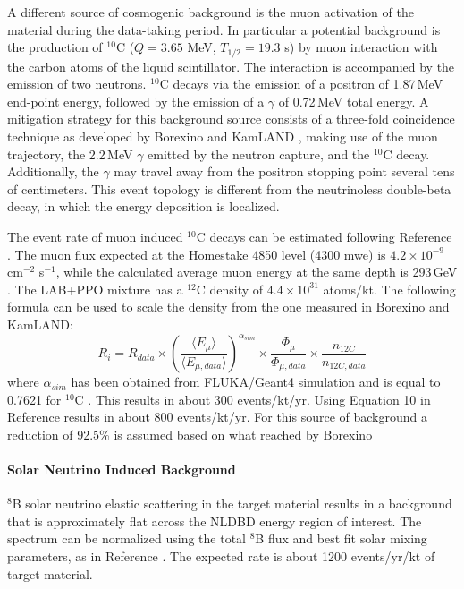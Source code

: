 A different source of cosmogenic background is the muon activation of the
material during the data-taking period. In particular a potential background
is the production of $^{10}$C ($Q=3.65$ MeV, $T_{1/2}=19.3$ s) by muon
interaction with the carbon atoms of the liquid scintillator. The interaction
is accompanied by the emission of two neutrons. $^{10}$C decays via the
emission of a positron of 1.87\,MeV end-point energy, followed by the
emission of a $\gamma$ of 0.72\,MeV total energy. A mitigation strategy for
this background source consists of a three-fold coincidence technique as
developed by Borexino and KamLAND \cite{galb05, gando16}, making use of the
muon trajectory, the 2.2\,MeV $\gamma$ emitted by the neutron capture, and
the $^{10}$C decay. Additionally, the $\gamma$ may travel away from the
positron stopping point several tens of centimeters. This event topology is
different from the neutrinoless double-beta decay, in which the energy
deposition is localized.

The event rate of muon induced $^{10}$C decays can be estimated following
Reference \cite{hagn00}. The muon flux expected at the Homestake 4850 level
(4300 mwe) is $4.2\times10^{-9}$ cm$^{-2}$ s$^{-1}$, while the calculated
average muon energy at the same depth is 293\,GeV \cite{mei06}. The
LAB+PPO mixture has a $^{12}$C density of $4.4\times 10^{31}$ atoms/kt.
The following formula can be used to scale the density from the one measured
in Borexino and KamLAND:
\begin{equation}
R_{i} = R_{data} \times 
{\left( \frac{\langle E_{\mu} \rangle}
             {\langle E_{\mu, data} \rangle} \right) }^{\alpha_{sim}} \times
\frac{\Phi_{\mu}}{\Phi_{\mu, data}} \times
\frac{n_{12C}}{n_{12C, data}}
\end{equation}
where $\alpha_{sim}$ has been obtained from FLUKA/Geant4 simulation and is
equal to 0.7621 for $^{10}$C \cite{zbiri10}. This results in about 300
events/kt/yr. Using Equation 10 in Reference \cite{hagn00} results in about
800 events/kt/yr. For this source of background a reduction of 92.5\% is assumed based on what reached by Borexino \cite{bxo2013}

\paragraph{Solar Neutrino Induced Background}
$^{8}$B solar neutrino elastic scattering in the target material results in
a background that is approximately flat across the NLDBD energy region of
interest. The spectrum can be normalized using the total $^{8}$B flux and
best fit solar mixing parameters, as in Reference \cite{SNO_3ph}. The expected
rate is about 1200 events/yr/kt of target material.\\

